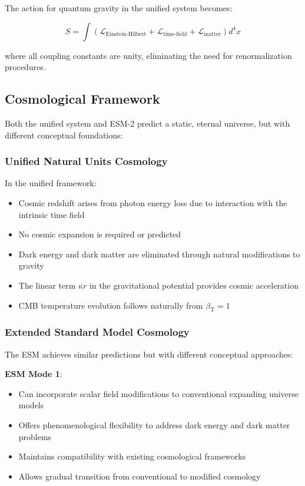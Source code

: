 \documentclass[12pt,a4paper]{article}
\newcommand{\betaT}{\beta_{\text{T}}}
\begin{document}
	The action for quantum gravity in the unified system becomes:
	
	\begin{equation}
		S = \int \left( \mathcal{L}_{\text{Einstein-Hilbert}} + \mathcal{L}_{\text{time-field}} + \mathcal{L}_{\text{matter}} \right) d^4x
	\end{equation}
	
	where all coupling constants are unity, eliminating the need for renormalization procedures.
	
	\subsection{Cosmological Framework}
	\label{subsec:cosmological_framework}
	
	Both the unified system and ESM-2 predict a static, eternal universe, but with different conceptual foundations:
	
	\subsubsection{Unified Natural Units Cosmology}
	\label{subsubsec:unified_cosmology}
	
	In the unified framework:
	\begin{itemize}
		\item Cosmic redshift arises from photon energy loss due to interaction with the intrinsic time field
		\item No cosmic expansion is required or predicted
		\item Dark energy and dark matter are eliminated through natural modifications to gravity
		\item The linear term $\kappa r$ in the gravitational potential provides cosmic acceleration
		\item CMB temperature evolution follows naturally from $\betaT = 1$
	\end{itemize}
	
	\subsubsection{Extended Standard Model Cosmology}
	\label{subsubsec:esm_cosmology}
	
	The ESM achieves similar predictions but with different conceptual approaches:
	
	\textbf{ESM Mode 1}:
	\begin{itemize}
		\item Can incorporate scalar field modifications to conventional expanding universe models
		\item Offers phenomenological flexibility to address dark energy and dark matter problems
		\item Maintains compatibility with existing cosmological frameworks
		\item Allows gradual transition from conventional to modified cosmology
	\end{itemize}
	
\end{document}
